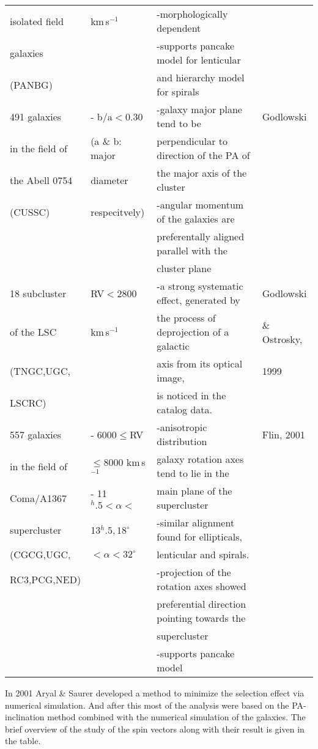 \begin{center}
\begin{tabular}[lp=7cm]{|l|l|l|l|}
isolated field&km\,s$^{-1}$&-morphologically dependent&\\
galaxies& &-supports pancake model for lenticular&\\
(PANBG)& &and hierarchy model for spirals&\\
\hline
491 galaxies&- b/a$<$0.30&-galaxy major plane tend to be& Godlowski\\
in the field of&(a \& b: major&perpendicular to direction of the PA of&\\
the Abell 0754&diameter &the major axis of the cluster&\\
(CUSSC)&respecitvely)&-angular momentum of the galaxies are&\\
 & &preferentally aligned parallel with the &\\
 & &cluster plane&\\
 \hline
 18 subcluster&RV$<$2800&-a strong systematic effect, generated by&Godlowski\\
 of the LSC&km\,s$^{-1}$&the process of deprojection of a galactic&\& Ostrosky,\\
 (TNGC,UGC,& &axis from its optical image, &1999\\
 LSCRC)& &is noticed in the catalog data.&\\
 \hline
557 galaxies&- 6000$\leq$RV&-anisotropic distribution&Flin, 2001\\
in the field of &$\leq$8000 km\,s$^{-1}$&galaxy rotation axes tend to lie in the&\\
Coma/A1367&- 11$^h.5<\alpha<$&main plane of the supercluster&\\
supercluster&13$^h.5,18^\circ$&-similar alignment found for ellipticals,&\\
(CGCG,UGC,&$<\alpha<32^\circ$&lenticular and spirals.&\\
RC3,PCG,NED)& &-projection of the rotation axes showed&\\
  & &preferential direction pointing towards the&\\
  & &supercluster&\\
  & &-supports pancake model&\\
  \hline
 
\end{tabular}
\end{center}
In 2001 Aryal \& Saurer developed a method to minimize the selection effect via numerical simulation. And after this most of the analysis were based on the PA-inclination method combined with the numerical simulation of the galaxies. The brief overview of the study of the spin vectors along with their result is given in the table. %
